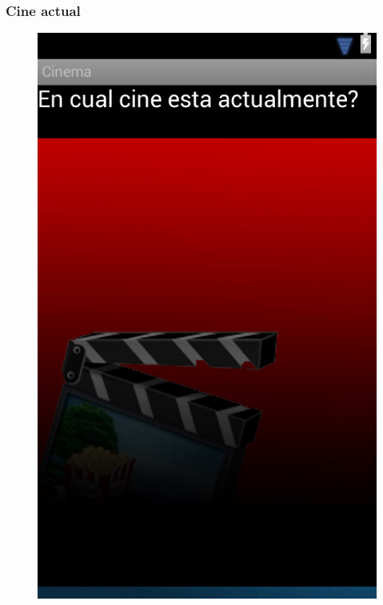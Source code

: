 \documentclass{beamer}
\begin{document}
\begin{frame}[allowframbreaks]
\frametitle{Cine actual}
\begin{figure}[h]
\centering
\includegraphics[height=0.8\textheight]{comprar.png}
\end{figure}
\end{frame}
\end{document}
